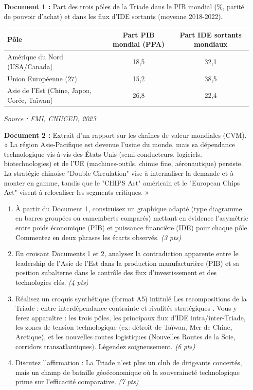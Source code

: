 \documentclass[11pt]{article}
\begin{document}
\begin{exercice}
    \textbf{Document 1 :} Part des trois pôles de la Triade dans le PIB mondial (\%, parité de pouvoir d'achat) et dans les flux d'IDE sortants (moyenne 2018-2022).\\
    \begin{tabular}{lcc}
        \toprule
        Pôle & Part PIB mondial (PPA) & Part IDE sortants mondiaux \\
        \midrule
        Amérique du Nord (USA/Canada) & 18,5 & 32,1 \\
        Union Européenne (27) & 15,2 & 38,5 \\
        Asie de l'Est (Chine, Japon, Corée, Taïwan) & 26,8 & 22,4 \\
        \bottomrule
    \end{tabular}
    \textit{Source : FMI, CNUCED, 2023.}

    \textbf{Document 2 :} Extrait d'un rapport sur les chaînes de valeur mondiales (CVM).\\
    « La région Asie-Pacifique est devenue l'usine du monde, mais sa dépendance technologique vis-à-vis des États-Unis (semi-conducteurs, logiciels, biotechnologies) et de l'UE (machines-outils, chimie fine, aéronautique) persiste. La stratégie chinoise "Double Circulation" vise à internaliser la demande et à monter en gamme, tandis que le "CHIPS Act" américain et le "European Chips Act" visent à relocaliser les segments critiques. »

    \begin{enumerate}
        \item À partir du Document 1, construisez un graphique adapté (type diagramme en barres groupées ou camemberts comparés) mettant en évidence l'asymétrie entre poids économique (PIB) et puissance financière (IDE) pour chaque pôle. Commentez en deux phrases les écarts observés. \textit{(3 pts)}
        \item En croisant Documents 1 et 2, analysez la contradiction apparente entre le leadership de l'Asie de l'Est dans la production manufacturière (PIB) et sa position subalterne dans le contrôle des flux d'investissement et des technologies clés. \textit{(4 pts)}
        \item Réalisez un croquis synthétique (format A5) intitulé \og Les recompositions de la Triade : entre interdépendance contrainte et rivalités stratégiques \fg. Vous y ferez apparaître : les trois pôles, les principaux flux d'IDE intra/inter-Triade, les zones de tension technologique (ex: détroit de Taïwan, Mer de Chine, Arctique), et les nouvelles routes logistiques (Nouvelles Routes de la Soie, corridors transatlantiques). Légendez soigneusement. \textit{(6 pts)}
        \item Discutez l'affirmation : \og La Triade n'est plus un club de dirigeants concertés, mais un champ de bataille géoéconomique où la souveraineté technologique prime sur l'efficacité comparative. \og \textit{(7 pts)}
    \end{enumerate}
\end{exercice}
\end{document}
